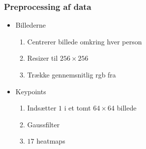 \documentclass{beamer}
\begin{document}
\begin{frame}
    \frametitle{Preprocessing af data}
    \begin{minipage}{0.5\textwidth}
        \begin{itemize}
            \item<2-> Billederne
            \begin{enumerate}
                \item Centrerer billede omkring hver person
                \item Resizer til $256 \times 256$
                \item Trække gennemsnitlig rgb fra
            \end{enumerate}
            \item<3-> Keypoints
            \begin{enumerate}
                \item Indsætter $1$ i et tomt $64 \times 64$ billede
                \item Gaussfilter
                \item $17$ heatmaps
            \end{enumerate}
        \end{itemize}
    \end{minipage}
    \begin{minipage}{0.45\textwidth}
    \end{minipage}
\end{frame}
\end{document}
